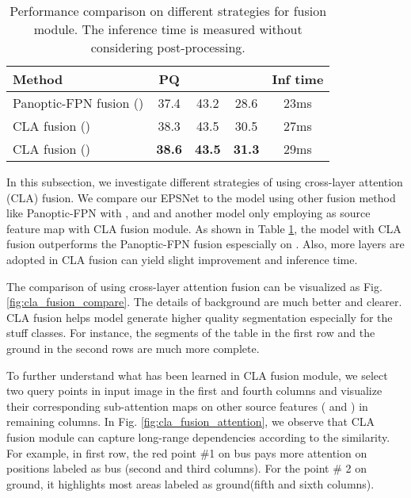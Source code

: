 \documentclass[runningheads]{llncs}
\begin{document}
    
\begin{table}[!tb]
\centering
    \caption{Performance comparison on different strategies for fusion module. The inference time is measured without considering post-processing.}
        \begin{tabular}{l  | c c c c}
    \hline
    Method &   PQ                   &  &  & Inf time \\ \hline \hline
         Panoptic-FPN fusion \cite{DeGeus2018a} ()    & 37.4 & 43.2 & 28.6 & 23ms\\ \hline
         CLA fusion ()    & 38.3 & 43.5 & 30.5  & 27ms\\ \hline
        CLA fusion ()     & \textbf{38.6} & \textbf{43.5} & \textbf{31.3}  & 29ms \\ \hline
    
    \end{tabular}
    \label{table:cla_fusion}
\end{table}



In this subsection, we investigate different strategies of using cross-layer attention (CLA) fusion. We compare our EPSNet to the model using other fusion method like Panoptic-FPN \cite{DeGeus2018a} with ,  and  and another model only employing  as source feature map with CLA fusion module. 
As shown in Table \ref{table:cla_fusion}, the model with CLA fusion outperforms the Panoptic-FPN fusion espescially on . Also, more layers are adopted in CLA fusion can yield slight improvement and inference time.

The comparison of using cross-layer attention fusion can be visualized as Fig. \ref{fig:cla_fusion_compare}. The details of background are much better and clearer. CLA fusion helps model generate higher quality segmentation especially for the stuff classes. For instance, the segments of the table in the first row and the ground in the second rows are much more complete. 


To further understand what has been learned in CLA fusion module, we select two query points in input image in the first and fourth columns and visualize their corresponding sub-attention maps on other source features ( and ) in remaining columns. In Fig. \ref{fig:cla_fusion_attention}, we observe that CLA fusion module can capture long-range dependencies according to the similarity. For example, in first row, the red point \#1 on bus pays more attention on  positions labeled as bus (second and third columns). For the point \# 2 on ground, it highlights most areas labeled as ground(fifth and sixth columns).
\end{document}
